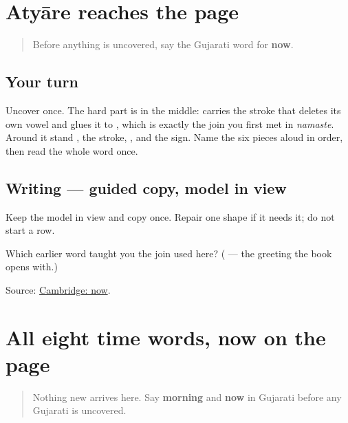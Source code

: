 \section[Practice]{Atyāre reaches the page}

\label{lesson:GU-C25-atyaare}



\begin{quote}
Before anything is uncovered, say the Gujarati word for \textbf{now}.
\end{quote}

\subsection*{Your turn}
Uncover \textbf{} once. The hard part is in the middle: \textbf{} carries the \textbf{} stroke that deletes its own vowel and glues it to \textbf{}, which is exactly the join you first met in \emph{namaste}. Around it stand \textbf{}, the \textbf{} stroke, \textbf{}, and the \textbf{} sign. Name the six pieces aloud in order, then read the whole word once.

\subsection*{Writing — guided copy, model in view}
Keep the model in view and copy \textbf{} once. Repair one shape if it needs it; do not start a row.

\begin{tcolorbox}[breakable,colback=teal!4,colframe=teal!35!black,title={Before you move on}]
Which earlier word taught you the \textbf{} join used here? (\textbf{} — the greeting the book opens with.)

Source: \href{https://dictionary.cambridge.org/dictionary/english-gujarati/now}{Cambridge: now}.
\end{tcolorbox}
\section[Practice]{All eight time words, now on the page}

\label{lesson:GU-C25-time-written}



\begin{quote}
Nothing new arrives here. Say \textbf{morning} and \textbf{now} in Gujarati before any Gujarati is uncovered.
\end{quote}

